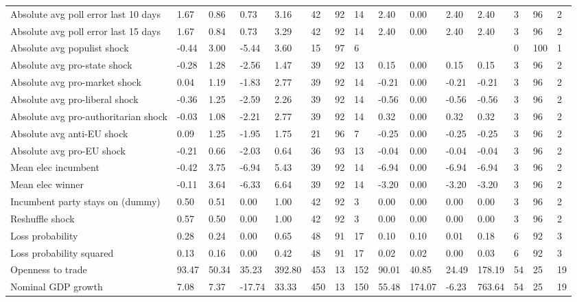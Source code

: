 \begin{longtable}{lllllllllllllll}
Absolute avg poll error last 10 days & 1.67 & 0.86 & 0.73 & 3.16 & 42 & 92 & 14 & 2.40 & 0.00 & 2.40 & 2.40 & 3 & 96 & 2\\
Absolute avg poll error last 15 days & 1.67 & 0.84 & 0.73 & 3.29 & 42 & 92 & 14 & 2.40 & 0.00 & 2.40 & 2.40 & 3 & 96 & 2\\
Absolute avg populist shock & -0.44 & 3.00 & -5.44 & 3.60 & 15 & 97 & 6 &  &  &  &  & 0 & 100 & 1\\
\addlinespace
Absolute avg pro-state shock & -0.28 & 1.28 & -2.56 & 1.47 & 39 & 92 & 13 & 0.15 & 0.00 & 0.15 & 0.15 & 3 & 96 & 2\\
Absolute avg pro-market shock & 0.04 & 1.19 & -1.83 & 2.77 & 39 & 92 & 14 & -0.21 & 0.00 & -0.21 & -0.21 & 3 & 96 & 2\\
Absolute avg pro-liberal shock & -0.36 & 1.25 & -2.59 & 2.26 & 39 & 92 & 14 & -0.56 & 0.00 & -0.56 & -0.56 & 3 & 96 & 2\\
Absolute avg pro-authoritarian shock & -0.03 & 1.08 & -2.21 & 2.77 & 39 & 92 & 14 & 0.32 & 0.00 & 0.32 & 0.32 & 3 & 96 & 2\\
Absolute avg anti-EU shock & 0.09 & 1.25 & -1.95 & 1.75 & 21 & 96 & 7 & -0.25 & 0.00 & -0.25 & -0.25 & 3 & 96 & 2\\
\addlinespace
Absolute avg pro-EU shock & -0.21 & 0.66 & -2.03 & 0.64 & 36 & 93 & 13 & -0.04 & 0.00 & -0.04 & -0.04 & 3 & 96 & 2\\
Mean elec incumbent & -0.42 & 3.75 & -6.94 & 5.43 & 39 & 92 & 14 & -6.94 & 0.00 & -6.94 & -6.94 & 3 & 96 & 2\\
Mean elec winner & -0.11 & 3.64 & -6.33 & 6.64 & 39 & 92 & 14 & -3.20 & 0.00 & -3.20 & -3.20 & 3 & 96 & 2\\
Incumbent party stays on (dummy) & 0.50 & 0.51 & 0.00 & 1.00 & 42 & 92 & 3 & 0.00 & 0.00 & 0.00 & 0.00 & 3 & 96 & 2\\
Reshuffle shock & 0.57 & 0.50 & 0.00 & 1.00 & 42 & 92 & 3 & 0.00 & 0.00 & 0.00 & 0.00 & 3 & 96 & 2\\
\addlinespace
Loss probability & 0.28 & 0.24 & 0.00 & 0.65 & 48 & 91 & 17 & 0.10 & 0.10 & 0.01 & 0.18 & 6 & 92 & 3\\
Loss probability squared & 0.13 & 0.16 & 0.00 & 0.42 & 48 & 91 & 17 & 0.02 & 0.02 & 0.00 & 0.03 & 6 & 92 & 3\\
Openness to trade & 93.47 & 50.34 & 35.23 & 392.80 & 453 & 13 & 152 & 90.01 & 40.85 & 24.49 & 178.19 & 54 & 25 & 19\\
Nominal GDP growth & 7.08 & 7.37 & -17.74 & 33.33 & 450 & 13 & 150 & 55.48 & 174.07 & -6.23 & 763.64 & 54 & 25 & 19\\

\end{longtable}
